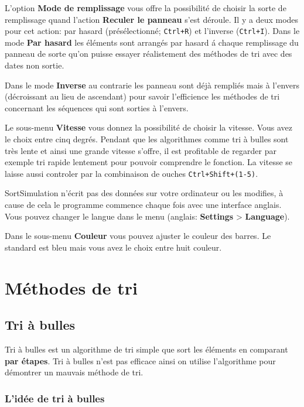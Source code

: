 \documentclass[11pt, a4paper, titlepage, twoside]{article}
\renewcommand{\emph}{\textbf}
\begin{document}
	L'option \emph{Mode de remplissage} vous offre la possibilité de choisir la sorte de remplissage quand l'action \emph{Reculer le panneau} s'est déroule. Il y a deux modes pour cet action: par hasard (présélectionné; \texttt{Ctrl+R}) et l'inverse (\texttt{Ctrl+I}). Dans le mode \emph{Par hasard} les éléments sont arrangés  par hasard á chaque remplissage du panneau de sorte qu'on puisse essayer réalistement des méthodes de tri avec des dates non sortie.
	
	Dans le mode \emph{Inverse} au contrarie les panneau sont déjà rempliés mais à l'envers (décroissant au lieu de ascendant) pour savoir l'efficience les méthodes de tri concernant les séquences qui sont sorties à l'envers.
	
	Le sous-menu \emph{Vitesse} vous donnez la possibilité de choisir la vitesse. Vous avez le choix entre cinq degrés. Pendant que les algorithmes comme tri à bulles sont très lente et ainsi une grande vitesse s'offre, il est profitable de regarder par exemple tri rapide lentement pour pouvoir comprendre le fonction. La vitesse se laisse aussi controler par la combinaison de ouches \texttt{Ctrl+Shift+(1-5)}.
	
	SortSimulation n'écrit pas des données sur votre ordinateur ou les modifies, à cause de cela le programme commence chaque fois avec une interface anglais. Vous pouvez changer le langue dans le menu (anglais: \emph{Settings} > \emph{Language}).
	
	Dans le sous-menu \emph{Couleur} vous pouvez ajuster le couleur des barres. Le standard est bleu mais vous avez le choix entre huit couleur.
	
	\section{Méthodes de tri}
	
	\subsection{Tri à bulles}
	
	Tri à bulles est un algorithme de tri simple que sort les éléments en comparant \emph{par étapes}. Tri à bulles n'est pas efficace ainsi on utilise l'algorithme pour démontrer un mauvais méthode de tri.
	
	\subsubsection{L'idée de tri à bulles}
	
\end{document}
